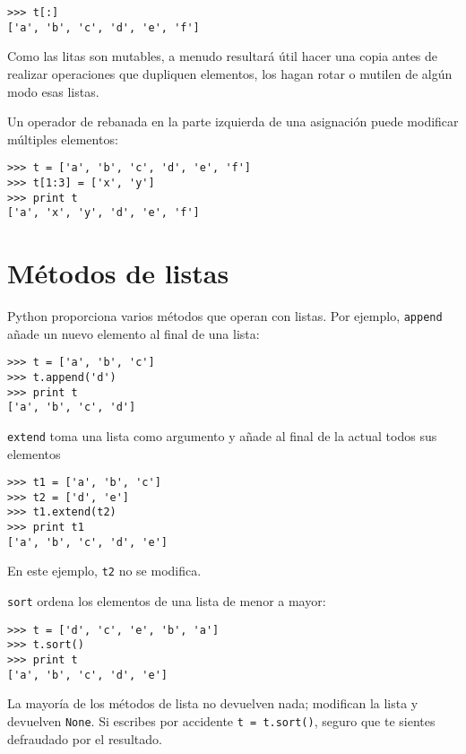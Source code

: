 \beforeverb
\begin{verbatim}
>>> t[:]
['a', 'b', 'c', 'd', 'e', 'f']
\end{verbatim}
\afterverb
%
Como las litas son mutables, a menudo resultará útil hacer una copia
antes de realizar operaciones que dupliquen elementos, los hagan rotar o mutilen
de algún modo esas listas.


Un operador de rebanada en la parte izquierda de una asignación
puede modificar múltiples elementos:


\beforeverb
\begin{verbatim}
>>> t = ['a', 'b', 'c', 'd', 'e', 'f']
>>> t[1:3] = ['x', 'y']
>>> print t
['a', 'x', 'y', 'd', 'e', 'f']
\end{verbatim}
\afterverb
%

\section{Métodos de listas}


Python proporciona varios métodos que operan con listas. Por ejemplo,
{\tt append} añade un nuevo elemento al final de una lista:


\beforeverb
\begin{verbatim}
>>> t = ['a', 'b', 'c']
>>> t.append('d')
>>> print t
['a', 'b', 'c', 'd']
\end{verbatim}
\afterverb
%
{\tt extend} toma una lista como argumento y añade al final de la actual
todos sus elementos


\beforeverb
\begin{verbatim}
>>> t1 = ['a', 'b', 'c']
>>> t2 = ['d', 'e']
>>> t1.extend(t2)
>>> print t1
['a', 'b', 'c', 'd', 'e']
\end{verbatim}
\afterverb
%
En este ejemplo, {\tt t2} no se modifica.

{\tt sort} ordena los elementos de una lista de menor a mayor:


\beforeverb
\begin{verbatim}
>>> t = ['d', 'c', 'e', 'b', 'a']
>>> t.sort()
>>> print t
['a', 'b', 'c', 'd', 'e']
\end{verbatim}
\afterverb
%
La mayoría de los métodos de lista no devuelven nada; modifican la lista y devuelven {\tt None}.
Si escribes por accidente {\tt t = t.sort()}, seguro que te sientes defraudado
por el resultado.

